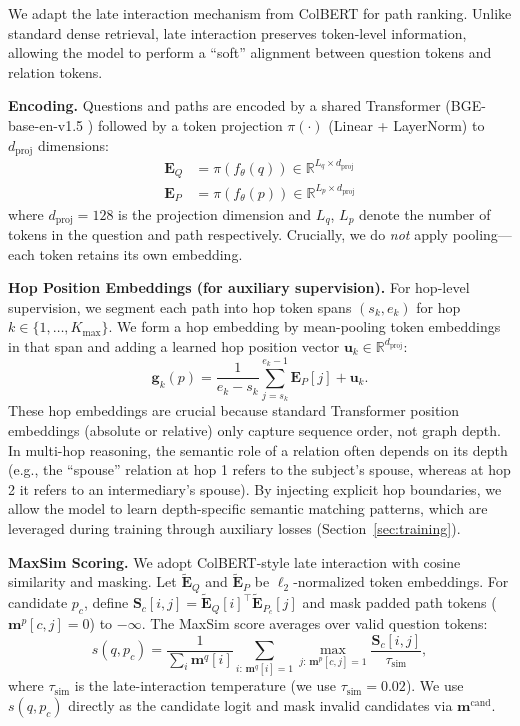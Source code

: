\documentclass[conference]{IEEEtran}
\begin{document}
We adapt the late interaction mechanism from ColBERT \cite{khattab2020colbert, santhanam2022colbertv2} for path ranking. Unlike standard dense retrieval, late interaction preserves token-level information, allowing the model to perform a ``soft'' alignment between question tokens and relation tokens.

\textbf{Encoding.} Questions and paths are encoded by a shared Transformer (BGE-base-en-v1.5 \cite{xiao2024bge}) followed by a token projection $\pi(\cdot)$ (Linear + LayerNorm) to $d_{\text{proj}}$ dimensions:
\begin{align}
    \mathbf{E}_Q &= \pi(f_{\theta}(q)) \in \mathbb{R}^{L_q \times d_{\text{proj}}} \\
    \mathbf{E}_P &= \pi(f_{\theta}(p)) \in \mathbb{R}^{L_p \times d_{\text{proj}}}
\end{align}
where $d_{\text{proj}} = 128$ is the projection dimension and $L_q$, $L_p$ denote the number of tokens in the question and path respectively. Crucially, we do \emph{not} apply pooling---each token retains its own embedding.

\textbf{Hop Position Embeddings (for auxiliary supervision).} For hop-level supervision, we segment each path into hop token spans $(s_k,e_k)$ for hop $k\in\{1,\dots,K_{\text{max}}\}$. We form a hop embedding by mean-pooling token embeddings in that span and adding a learned hop position vector $\mathbf{u}_k\in\mathbb{R}^{d_{\text{proj}}}$:
\begin{equation}
\label{eq:hop-embed}
    \mathbf{g}_k(p)=\frac{1}{e_k-s_k}\sum_{j=s_k}^{e_k-1}\mathbf{E}_P[j] + \mathbf{u}_k.
\end{equation}
These hop embeddings are crucial because standard Transformer position embeddings (absolute or relative) only capture sequence order, not graph depth. In multi-hop reasoning, the semantic role of a relation often depends on its depth (e.g., the “spouse” relation at hop 1 refers to the subject's spouse, whereas at hop 2 it refers to an intermediary's spouse). By injecting explicit hop boundaries, we allow the model to learn depth-specific semantic matching patterns, which are leveraged during training through auxiliary losses (Section~\ref{sec:training}).

\textbf{MaxSim Scoring.} We adopt ColBERT-style late interaction with cosine similarity and masking. Let $\tilde{\mathbf{E}}_Q$ and $\tilde{\mathbf{E}}_P$ be $\ell_2$-normalized token embeddings. For candidate $p_c$, define $\mathbf{S}_c[i,j]=\tilde{\mathbf{E}}_Q[i]^\top \tilde{\mathbf{E}}_{P_c}[j]$ and mask padded path tokens ($\mathbf{m}^p[c,j]=0$) to $-\infty$. The MaxSim score averages over valid question tokens:
\begin{equation}
\label{eq:maxsim}
    s(q,p_c)=\frac{1}{\sum_i \mathbf{m}^q[i]}\sum_{i:\,\mathbf{m}^q[i]=1}\max_{j:\,\mathbf{m}^p[c,j]=1}\frac{\mathbf{S}_c[i,j]}{\tau_{\text{sim}}},
\end{equation}
where $\tau_{\text{sim}}$ is the late-interaction temperature (we use $\tau_{\text{sim}}=0.02$). We use $s(q,p_c)$ directly as the candidate logit and mask invalid candidates via $\mathbf{m}^{\mathrm{cand}}$.
\end{document}
